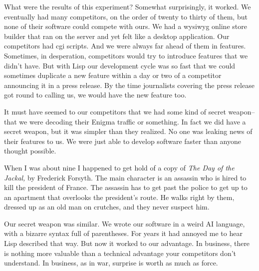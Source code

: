 What
                  were the results of this experiment? Somewhat surprisingly, it
                  worked. We eventually had many competitors, on the order of
                  twenty to thirty of them, but none of their software could
                  compete with ours. We had a wysiwyg online store builder that
                  ran on the server and yet felt like a desktop application. Our
                  competitors had cgi scripts. And we were always far ahead of
                  them in features. Sometimes, in desperation, competitors would
                  try to introduce features that we didn't have. But with Lisp
                  our development cycle was so fast that we could sometimes
                  duplicate a new feature within a day or two of a competitor
                  announcing it in a press release. By the time journalists
                  covering the press release got round to calling us, we would
                  have the new feature too.

It must have seemed to
                  our competitors that we had some kind of secret weapon-- that
                  we were decoding their Enigma traffic or something. In fact we
                  did have a secret weapon, but it was simpler than they
                  realized. No one was leaking news of their features to us. We
                  were just able to develop software faster than anyone thought
                  possible.

When I was about nine I happened to get
                  hold of a copy of \emph{The Day of the Jackal,} by Frederick
                  Forsyth. The main character is an assassin who is hired to
                  kill the president of France. The assassin has to get past the
                  police to get up to an apartment that overlooks the
                  president's route. He walks right by them, dressed up as an
                  old man on crutches, and they never suspect him.

Our
                  secret weapon was similar. We wrote our software in a weird AI
                  language, with a bizarre syntax full of parentheses. For years
                  it had annoyed me to hear Lisp described that way. But now it
                  worked to our advantage. In business, there is nothing more
                  valuable than a technical advantage your competitors don't
                  understand. In business, as in war, surprise is worth as much
                  as force.

